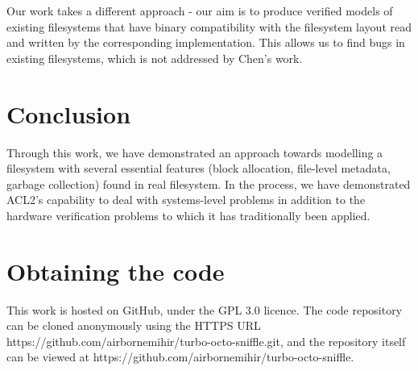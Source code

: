 \documentclass[format=sigconf,review=true]{acmart}
\begin{document}
Our work takes a different approach - our aim is to produce verified
models of existing filesystems that have binary compatibility with the
filesystem layout read and written by the corresponding
implementation. This allows us to find bugs in existing filesystems,
which is not addressed by Chen's work.

\section{Conclusion}
Through this work, we have demonstrated an approach towards modelling
a filesystem with several essential features (block allocation,
file-level metadata, garbage collection) found in real filesystem. In
the process, we have demonstrated ACL2's capability to deal with
systems-level problems in addition to the hardware verification
problems to which it has traditionally been applied.

\section{Obtaining the code}
This work is hosted on GitHub, under the GPL 3.0 licence. The code
repository can be cloned anonymously using the HTTPS URL
https://github.com/airbornemihir/turbo-octo-sniffle.git, and the
repository itself can be viewed at
https://github.com/airbornemihir/turbo-octo-sniffle.



\end{document}
